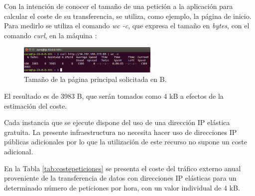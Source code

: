Con la intención de conocer el tamaño de una petición a la aplicación para calcular el coste de su transferencia, se utiliza, como ejemplo, la página de inicio. Para medirlo se utiliza el comando \textit{wc -c}, que expresa el tamaño en \textit{bytes}, con el comando \textit{curl}, en la máquina :

\begin{figure}[H]
\centering
\includegraphics[width=0.6\textwidth]{images/figures/curl-wc.png}
\caption{Tamaño de la página principal solicitada en B.}
\end{figure}

El resultado es de 3983 B, que serán tomados como 4 kB a efectos de la estimación del coste.

Cada instancia que se ejecute dispone del uso de una dirección IP elástica gratuita. La presente infraestructura no necesita hacer uso de direcciones IP públicas adicionales por lo que la utilización de este recurso no supone un coste adicional.

En la Tabla \ref{tab:costepeticiones} se presenta el coste del tráfico externo anual proveniente de la transferencia de datos con direcciones IP elásticas para un determinado número de peticiones por hora, con un valor individual de 4 kB.

\FloatBarrier

